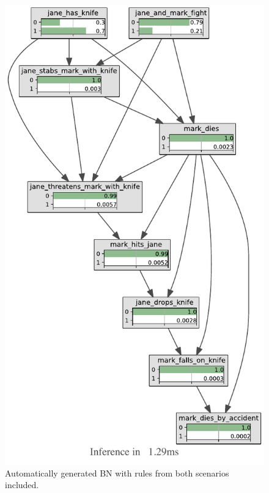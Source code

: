 \begin{figure}[htbp]
\begin{center}
\includegraphics[scale=0.8]{images/Kb.pdf}
\caption{Automatically generated BN with rules from both scenarios included.}
\label{full}
\end{center}
\end{figure}



